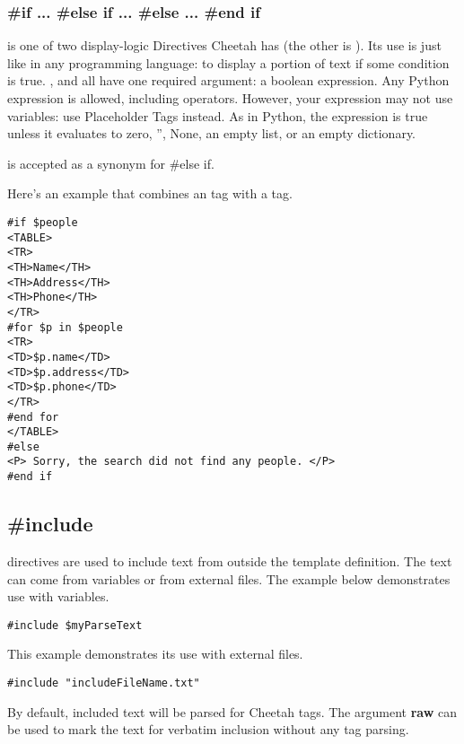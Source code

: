 \subsubsection{\#if ... \#else if ... \#else ... \#end if}

 is one of two display-logic Directives Cheetah has (the other is
).  Its use is just like in any programming language: to display
a portion of text if some condition is true.  
,  and  all have one required argument:
a boolean expression.  Any Python expression is allowed, including operators.
However, your expression may not use variables:  use Placeholder Tags instead.
As in Python, the expression is true unless it evaluates to zero, '', None, an
empty list, or an empty dictionary.

 is accepted as a synonym for {\#else if}.

Here's an example that combines an  tag with a  tag.

\begin{verbatim}
#if $people
<TABLE>
<TR>
<TH>Name</TH>
<TH>Address</TH>
<TH>Phone</TH>
</TR>
#for $p in $people
<TR>
<TD>$p.name</TD>
<TD>$p.address</TD>
<TD>$p.phone</TD>
</TR>
#end for
</TABLE>
#else
<P> Sorry, the search did not find any people. </P>
#end if
\end{verbatim}



\subsection{\#include}

 directives are used to include text from outside the template
definition.  The text can come from  variables or from
external files.  The example below demonstrates use with 
variables.

\begin{verbatim}
#include $myParseText
\end{verbatim}

This example demonstrates its use with external files.
\begin{verbatim}
#include "includeFileName.txt"
\end{verbatim}

By default, included text will be parsed for Cheetah tags.  The argument
{\bf raw} can be used to mark the text for verbatim inclusion without any tag
parsing.

